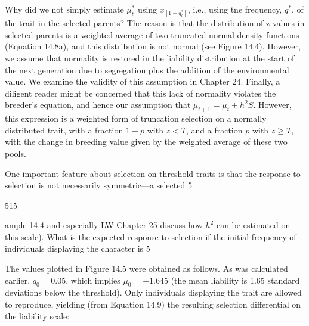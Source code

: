 \documentclass{article}
\begin{document}
Why did we not simply estimate  $ \mu_t^* $ using  $ x_{[1-q_t^*]} $, i.e., using tne frequency,  $ q^* $, of the trait in the selected parents? The reason is that the distribution of z values in selected parents is a weighted average of two truncated normal density functions (Equation 14.8a), and this distribution is not normal (see Figure 14.4). However, we assume that normality is restored in the liability distribution at the start of the next generation due to segregation plus the addition of the environmental value. We examine the validity of this assumption in Chapter 24. Finally, a diligent reader might be concerned that this lack of normality violates the breeder's equation, and hence our assumption that  $ \mu_{t+1} = \mu_t + h^2 S $. However, this expression is a weighted form of truncation selection on a normally distributed trait, with a fraction  $ 1 - p $ with  $ z < T $, and a fraction  $ p $ with  $ z \geq T $, with the change in breeding value given by the weighted average of these two pools.

One important feature about selection on threshold traits is that the response to selection is not necessarily symmetric—a selected 5%

515

ample 14.4 and especially LW Chapter 25 discuss how  $ h^{2} $ can be estimated on this scale). What is the expected response to selection if the initial frequency of individuals displaying the character is 5%

The values plotted in Figure 14.5 were obtained as follows. As was calculated earlier,  $ q_0 = 0.05 $, which implies  $ \mu_0 = -1.645 $ (the mean liability is 1.65 standard deviations below the threshold). Only individuals displaying the trait are allowed to reproduce, yielding (from Equation 14.9) the resulting selection differential on the liability scale:
\end{document}

